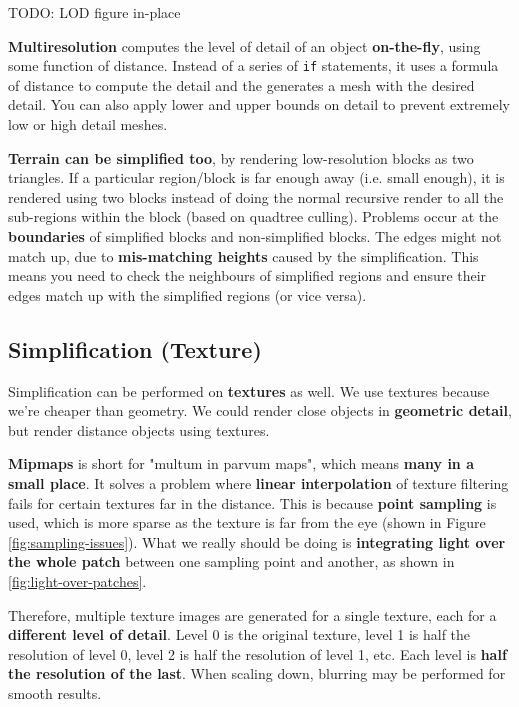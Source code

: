 \documentclass{article}
\begin{document}
TODO: LOD figure in-place

\textbf{Multiresolution} computes the level of detail of an object \textbf{on-the-fly}, using some function of distance. Instead of a series of \texttt{if} statements, it uses a formula of distance to compute the detail and the generates a mesh with the desired detail. You can also apply lower and upper bounds on detail to prevent extremely low or high detail meshes.

\textbf{Terrain can be simplified too}, by rendering low-resolution blocks as two triangles. If a particular region/block is far enough away (i.e. small enough), it is rendered using two blocks instead of doing the normal recursive render to all the sub-regions within the block (based on quadtree culling). Problems occur at the \textbf{boundaries} of simplified blocks and non-simplified blocks. The edges might not match up, due to \textbf{mis-matching heights} caused by the simplification. This means you need to check the neighbours of simplified regions and ensure their edges match up with the simplified regions (or vice versa).

\subsection{Simplification (Texture)}

Simplification can be performed on \textbf{textures} as well. We use textures because we're cheaper than geometry. We could render close objects in \textbf{geometric detail}, but render distance objects using textures.

\textbf{Mipmaps} is short for "multum in parvum maps", which means \textbf{many in a small place}. It solves a problem where \textbf{linear interpolation} of texture filtering fails for certain textures far in the distance. This is because \textbf{point sampling} is used, which is more sparse as the texture is far from the eye (shown in Figure \ref{fig:sampling-issues}). What we really should be doing is \textbf{integrating light over the whole patch} between one sampling point and another, as shown in \ref{fig:light-over-patches}.

Therefore, multiple texture images are generated for a single texture, each for a \textbf{different level of detail}. Level 0 is the original texture, level 1 is half the resolution of level 0, level 2 is half the resolution of level 1, etc. Each level is \textbf{half the resolution of the last}. When scaling down, blurring may be performed for smooth results.
\end{document}
